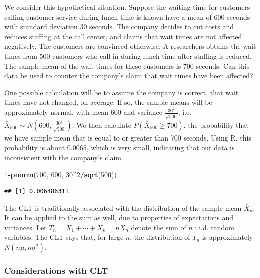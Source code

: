 \documentclass[
]{book}
\newenvironment{Shaded}{\begin{snugshade}}{\end{snugshade}}
\newcommand{\DecValTok}[1]{\textcolor[rgb]{0.00,0.00,0.81}{#1}}
\newcommand{\FunctionTok}[1]{\textcolor[rgb]{0.13,0.29,0.53}{\textbf{#1}}}
\newcommand{\NormalTok}[1]{#1}
\newcommand{\SpecialCharTok}[1]{\textcolor[rgb]{0.81,0.36,0.00}{\textbf{#1}}}
\begin{document}
We consider this hypothetical situation. Suppose the waiting time for customers calling customer service during lunch time is known have a mean of 600 seconds with standard deviation 30 seconds. The company decides to cut costs and reduces staffing at the call center, and claims that wait times are not affected negatively. The customers are convinced otherwise. A researchers obtains the wait times from 500 customers who call in during lunch time after staffing is reduced. The sample mean of the wait times for these customers is 700 seconds. Can this data be used to counter the company's claim that wait times have been affected?

One possible calculation will be to assume the company is correct, that wait times have not changed, on average. If so, the sample means will be approximately normal, with mean 600 and variance \(\frac{30^2}{\sqrt{500}}\), i.e.~\(\bar{X}_{500} \sim N(600, \frac{30^2}{\sqrt{500}})\). We then calculate \(P(\bar{X}_{500} \geq 700)\), the probability that we have sample mean that is equal to or greater than 700 seconds. Using R, this probability is about 0.0065, which is very small, indicating that our data is inconsistent with the company's claim.

\begin{Shaded}
\begin{Highlighting}[]
\DecValTok{1}\SpecialCharTok{{-}}\FunctionTok{pnorm}\NormalTok{(}\DecValTok{700}\NormalTok{, }\DecValTok{600}\NormalTok{, }\DecValTok{30}\SpecialCharTok{\^{}}\DecValTok{2}\SpecialCharTok{/}\FunctionTok{sqrt}\NormalTok{(}\DecValTok{500}\NormalTok{))}
\end{Highlighting}
\end{Shaded}

\begin{verbatim}
## [1] 0.006486311
\end{verbatim}

The CLT is traditionally associated with the distribution of the sample mean \(\bar{X}_n\). It can be applied to the sum as well, due to properties of expectations and variances. Let \(T_n = X_1 + \cdots + X_n = n \bar{X}_n\) denote the sum of \(n\) i.i.d. random variables. The CLT says that, for large \(n\), the distribution of \(T_n\) is approximately \(N(n\mu, n\sigma^2)\).

\hypertarget{considerCLT}{%
\subsubsection{Considerations with CLT}\label{considerCLT}}
\end{document}
